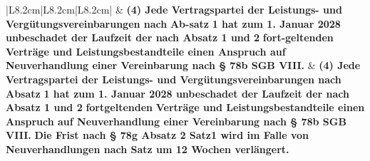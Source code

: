 \documentclass[10pt,a4paper,landscape]{article}
\begin{document}
\begin{longtable}{|L{8.2cm}|L{8.2cm}|L{8.2cm}|}
 & \textbf{(4) Jede Vertragspartei der Leistungs-  \newline und Vergütungsvereinbarungen nach} \newline \textbf{\textcolor{diffred}{Ab-satz}}\textbf{ 1 hat zum 1. Januar 2028  \newline unbeschadet der Laufzeit der nach  \newline Absatz 1 und 2 }\textbf{\textcolor{diffred}{fort-geltenden}}\textbf{ Verträge  \newline und Leistungsbestandteile einen  \newline Anspruch auf Neuverhandlung einer  \newline Vereinbarung nach \S{} 78b SGB VIII. } & \textbf{(4) Jede Vertragspartei der Leistungs-  \newline und Vergütungsvereinbarungen nach} \newline \textbf{\textcolor{diffgreen}{Absatz}}\textbf{ 1 hat zum 1. Januar 2028  \newline unbeschadet der Laufzeit der nach  \newline Absatz 1 und 2 }\textbf{\textcolor{diffgreen}{fortgeltenden}}\textbf{ Verträge  \newline und Leistungsbestandteile einen  \newline Anspruch auf Neuverhandlung einer  \newline Vereinbarung nach \S{} 78b SGB VIII.} \textbf{\textcolor{diffgreen}{Die  \newline Frist nach \S{} 78g Absatz 2 Satz1 wird im  \newline Falle von Neuverhandlungen nach Satz   um 12 Wochen verlängert.}} \\
\hhline{|---|}

\end{longtable}
\end{document}
